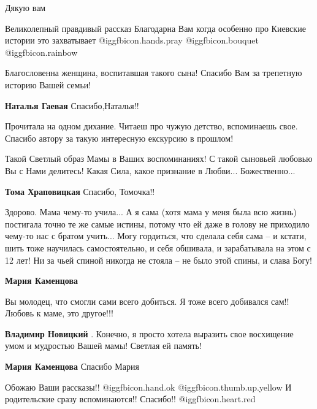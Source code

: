 \begin{itemize}
Дякую вам


Великолепный правдивый рассказ Благодарна Вам когда особенно про Киевские
истории это захватывает  @igg{fbicon.hands.pray}  @igg{fbicon.bouquet}
@igg{fbicon.rainbow} 


Благословенна женщина, воспитавшая такого сына! Спасибо Вам за трепетную историю Вашей семьи!


\textbf{Наталья Гаевая} Спасибо,Наталья!!


Прочитала на одном дихание. Читаеш про чужую детство, вспоминаешь свое. Спасибо
автору за такую интересную екскурсию в прошлом!



Такой Светлый образ Мамы в Ваших воспоминаниях! С такой сыновьей любовью Вы с
Нами делитесь! Какая Сила, какое признание в Любви... Божественно...

\textbf{Тома Храповицкая} Спасибо, Томочка!!


Здорово. Мама чему-то учила... А я сама (хотя мама у меня была всю жизнь)
постигала точно те же самые истины, потому что ей даже в голову не приходило
чему-то нас с братом учить... Могу гордиться, что сделала себя сама – и кстати,
шить тоже научилась самостоятельно, и себя обшивала, и зарабатывала на этом с
12 лет! Ни за чьей спиной никогда не стояла – не было этой спины, и слава Богу!

\begin{itemize} %
\textbf{Мария Каменцова} 

Вы молодец, что смогли сами всего добиться. Я тоже всего добивался сам!! Любовь
к маме, это другое!!!

\textbf{Владимир Новицкий} . Конечно, я просто хотела выразить свое восхищение умом и мудростью Вашей мамы! Светлая ей память!

\textbf{Мария Каменцова} Спасибо Мария
\end{itemize} %


Обожаю Ваши рассказы!! @igg{fbicon.hand.ok}  @igg{fbicon.thumb.up.yellow} И родительские сразу вспоминаются!! Спасибо!!
@igg{fbicon.heart.red}


\end{itemize}
